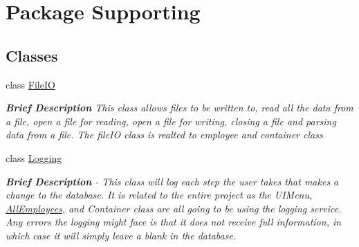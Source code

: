 \hypertarget{namespace_supporting}{}\section{Package Supporting}
\label{namespace_supporting}
\subsection*{Classes}
\begin{DoxyCompactItemize}
\item 
class \hyperlink{class_supporting_1_1_file_i_o}{File\+I\+O}
\begin{DoxyCompactList}\small\item\em {\bfseries Brief Description} This class allows files to be written to, read all the data from a file, open a file for reading, open a file for writing, closing a file and parsing data from a file. The file\+I\+O class is realted to employee and container class \end{DoxyCompactList}\item 
class \hyperlink{class_supporting_1_1_logging}{Logging}
\begin{DoxyCompactList}\small\item\em {\bfseries Brief Description} -\/ This class will log each step the user takes that makes a change to the database. It is related to the entire project as the U\+I\+Menu, \hyperlink{namespace_all_employees}{All\+Employees}, and Container class are all going to be using the logging service. Any errors the logging might face is that it does not receive full information, in which case it will simply leave a blank in the database. \end{DoxyCompactList}\end{DoxyCompactItemize}
